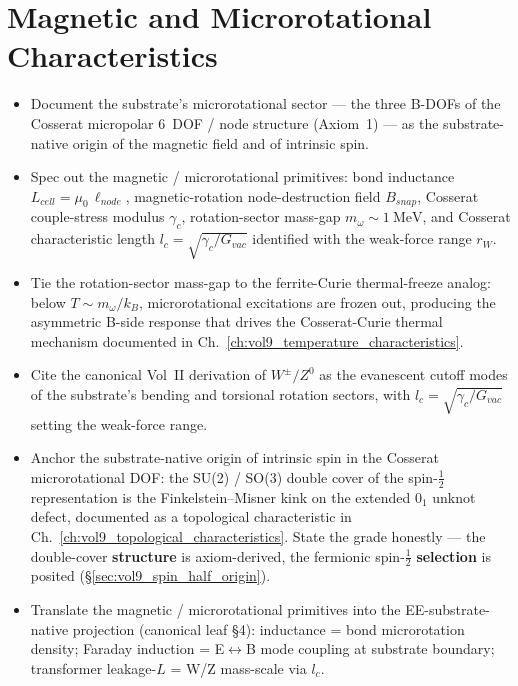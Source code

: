 \chapter{Magnetic and Microrotational Characteristics}
\label{ch:vol9_magnetic_microrotational_characteristics}

\begin{objectivebox}
\begin{itemize}
    \item Document the substrate's microrotational sector --- the three B-DOFs of the Cosserat micropolar 6~DOF / node structure (Axiom~1) --- as the substrate-native origin of the magnetic field and of intrinsic spin.
    \item Spec out the magnetic / microrotational primitives: bond inductance $L_{cell} = \mu_0\, \ell_{node}$, magnetic-rotation node-destruction field $B_{snap}$, Cosserat couple-stress modulus $\gamma_c$, rotation-sector mass-gap $m_\omega \sim \qty{1}{\mega\electronvolt}$, and Cosserat characteristic length $l_c = \sqrt{\gamma_c / G_{vac}}$ identified with the weak-force range $r_W$.
    \item Tie the rotation-sector mass-gap to the ferrite-Curie thermal-freeze analog: below $T \sim m_\omega/k_B$, microrotational excitations are frozen out, producing the asymmetric B-side response that drives the Cosserat-Curie thermal mechanism documented in Ch.~\ref{ch:vol9_temperature_characteristics}.
    \item Cite the canonical Vol~II derivation of $W^\pm / Z^0$ as the evanescent cutoff modes of the substrate's bending and torsional rotation sectors, with $l_c = \sqrt{\gamma_c/G_{vac}}$ setting the weak-force range.
    \item Anchor the substrate-native origin of intrinsic spin in the Cosserat microrotational DOF: the SU(2) / SO(3) double cover of the spin-$\tfrac{1}{2}$ representation is the Finkelstein--Misner kink on the extended $0_1$ unknot defect, documented as a topological characteristic in Ch.~\ref{ch:vol9_topological_characteristics}. State the grade honestly --- the double-cover \textbf{structure} is axiom-derived, the fermionic spin-$\tfrac{1}{2}$ \textbf{selection} is posited (\S\ref{sec:vol9_spin_half_origin}).
    \item Translate the magnetic / microrotational primitives into the EE-substrate-native projection (canonical leaf  \S 4): inductance = bond microrotation density; Faraday induction = E$\leftrightarrow$B mode coupling at substrate boundary; transformer leakage-$L$ = W/Z mass-scale via $l_c$.
\end{itemize}
\end{objectivebox}

